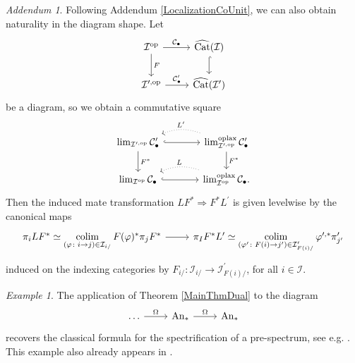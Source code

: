 \documentclass[a4paper,reqno,10pt]{amsart}
\theoremstyle{definition}
\theoremstyle{remark}
\newtheorem{example}[theorem]{Example}
\newtheorem{addendum}[theorem]{Addendum}
\newcommand{\C}{\mathcal{C}}
\newcommand{\I}{\mathcal{I}}
\DeclareMathOperator*{\colim}{colim}
\newcommand{\Cat}{\mathrm{Cat}}
\newcommand{\An}{\mathrm{An}}
\newcommand{\oplax}{\mathrm{oplax}}
\newcommand{\op}{\mathrm{op}}
\begin{document}
\begin{addendum}\label{NaturalityInShape}
Following Addendum \ref{LocalizationCoUnit}, we can also obtain naturality in the diagram shape. Let
\begin{equation*}
\begin{tikzcd}
\I^{\op}\arrow[r,"\C_{\bullet}"]\arrow[d,"F"] & \widehat{\Cat}(\I)\arrow[d,hookrightarrow]\\
\I^{\prime,\op}\arrow[r,"\C_{\bullet}^{\prime}"] & \widehat{\Cat}(\I^{\prime})
\end{tikzcd}
\end{equation*}
be a diagram, so we obtain a commutative square
\begin{equation*}
\begin{tikzcd}[column sep=large]
\lim_{\I^{\prime,\op}}\C_{\bullet}^{\prime}\arrow[r,hookrightarrow]\arrow[d,"F^{\ast}"] & \lim_{\I^{\prime,\op}}^{\oplax}\C_{\bullet}^{\prime}\arrow[l,bend right=2em,dotted,"L^{\prime}"']\arrow[d,"F^{\ast}"]\\
\lim_{\I^{\op}}\C_{\bullet}\arrow[r,hookrightarrow] & \lim_{\I^{\op}}^{\oplax}\C_{\bullet}.\arrow[l,bend right=2em,dotted,"L" above]
\end{tikzcd}
\end{equation*}
Then the induced mate transformation $LF^{\ast}\Rightarrow F^{\ast}L^{\prime}$ is given levelwise by the canonical maps
\begin{equation*}
\begin{tikzcd}
\pi_iLF^{\ast}\simeq\colim\limits_{(\varphi\colon i\rightarrow j)\in\I_{i/}}F(\varphi)^{\ast}\pi_jF^{\ast}\arrow[r] & \pi_IF^{\ast}L^{\prime}\simeq\colim\limits_{(\varphi^{\prime}\colon F(i)\rightarrow j^{\prime})\in\I_{F(i)/}^{\prime}}\varphi^{\prime,\ast}\pi_{j^{\prime}}^{\prime}
\end{tikzcd}
\end{equation*}
induced on the indexing categories by $F_{i/}\colon\I_{i/}\rightarrow\I^{\prime}_{F(i)/}$, for all $i\in\I$.
\end{addendum}

\begin{example}
The application of Theorem \ref{MainThmDual} to the diagram
\begin{equation*}
\begin{tikzcd}
\dotsc\arrow[r,"\Omega"] & \An_{\ast}\arrow[r,"\Omega"] & \An_{\ast}
\end{tikzcd}
\end{equation*}
recovers the classical formula for the spectrification of a pre-spectrum, see e.g. \cite[p. 3]{LMS}. This example also already appears in \cite[Section 35.5]{Joyal}.
\end{example}
\end{document}
